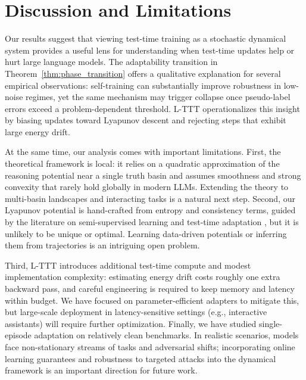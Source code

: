 \documentclass{article}
\theoremstyle{plain}
\theoremstyle{definition}
\theoremstyle{remark}
\begin{document}
\section{Discussion and Limitations}

Our results suggest that viewing test-time training as a stochastic dynamical system provides a useful lens for understanding when test-time updates help or hurt large language models. The adaptability transition in Theorem~\ref{thm:phase_transition} offers a qualitative explanation for several empirical observations: self-training can substantially improve robustness in low-noise regimes, yet the same mechanism may trigger collapse once pseudo-label errors exceed a problem-dependent threshold. L-TTT operationalizes this insight by biasing updates toward Lyapunov descent and rejecting steps that exhibit large energy drift.

At the same time, our analysis comes with important limitations. First, the theoretical framework is local: it relies on a quadratic approximation of the reasoning potential near a single truth basin and assumes smoothness and strong convexity that rarely hold globally in modern LLMs. Extending the theory to multi-basin landscapes and interacting tasks is a natural next step. Second, our Lyapunov potential is hand-crafted from entropy and consistency terms, guided by the literature on semi-supervised learning and test-time adaptation \cite{grandvalet2005entropy,sohn2020fixmatch,zhai2019s4l,zhang2024surveytta}, but it is unlikely to be unique or optimal. Learning data-driven potentials or inferring them from trajectories is an intriguing open problem.

Third, L-TTT introduces additional test-time compute and modest implementation complexity: estimating energy drift costs roughly one extra backward pass, and careful engineering is required to keep memory and latency within budget. We have focused on parameter-efficient adapters to mitigate this, but large-scale deployment in latency-sensitive settings (e.g., interactive assistants) will require further optimization. Finally, we have studied single-episode adaptation on relatively clean benchmarks. In realistic scenarios, models face non-stationary streams of tasks and adversarial shifts; incorporating online learning guarantees and robustness to targeted attacks into the dynamical framework \cite{shalev2011online,forestonline2019,wei2024jailbreak} is an important direction for future work.
\end{document}
